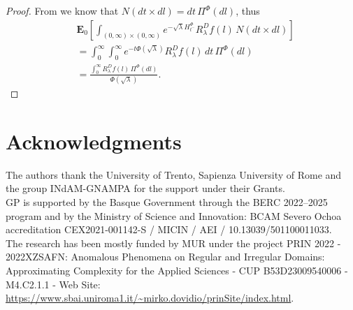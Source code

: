 \documentclass[11pt,a4paper]{article}
\theoremstyle{plain}
\theoremstyle{definition}
\theoremstyle{remark}
\begin{document}
\begin{proof}
			From \cite[Example II.4.1]{ikeda2014stochastic} we know that \(N(dt \times dl)= dt \, \Pi^\Phi(dl)\), thus
			\begin{align*}
				&\mathbf{E}_{0} \left[\int_{(0,\infty) \times (0,\infty)} e^{-\sqrt{\lambda} H^\Phi_{t^-}} R_\lambda^D f(l)\, N(dt \times dl)\right]\\
				&=\int_0^\infty \int_0^\infty e^{-t \Phi(\sqrt{\lambda})} R_\lambda^D f(l)\, dt \,\Pi^\Phi(dl)\\
				&=\frac{\displaystyle\int_0^\infty R_\lambda^D f(l)\,\Pi^\Phi(dl)}{\Phi(\sqrt{\lambda})}.
			\end{align*}
		\end{proof}
		
		
		
		
		\section*{Acknowledgments}
		The authors thank the University of Trento, Sapienza University of Rome and the group INdAM-GNAMPA for the support under their Grants.\\
		GP is supported by the Basque Government through the BERC 2022--2025 program and by the Ministry of Science and Innovation: BCAM Severo Ochoa accreditation CEX2021-001142-S / MICIN / AEI / 10.13039/501100011033.\\
		The research has been mostly funded by MUR under the project PRIN 2022 - 2022XZSAFN: Anomalous Phenomena on Regular and Irregular Domains: Approximating Complexity for the Applied Sciences - CUP B53D23009540006 - M4.C2.1.1 - Web Site: \url{https://www.sbai.uniroma1.it/~mirko.dovidio/prinSite/index.html}.
		
\end{document}
